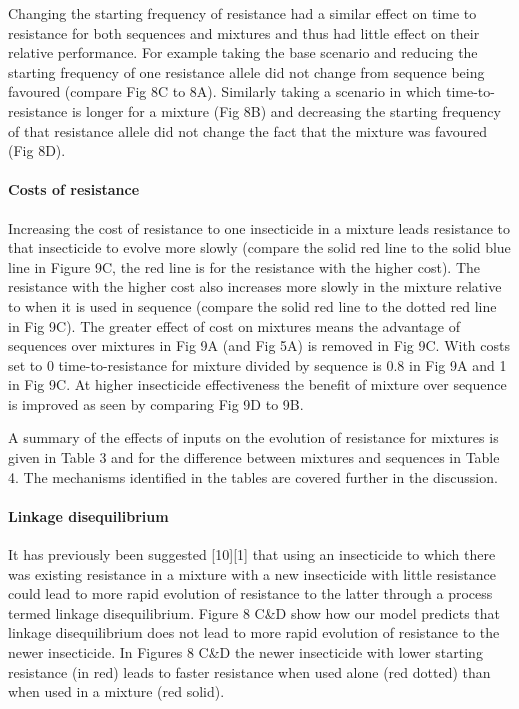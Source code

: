 \documentclass[11pt,]{article}
\let\oldparagraph\paragraph
\renewcommand{\paragraph}[1]{\oldparagraph{#1}\mbox{}}
\begin{document}
Changing the starting frequency of resistance had a similar effect on
time to resistance for both sequences and mixtures and thus had little
effect on their relative performance. For example taking the base
scenario and reducing the starting frequency of one resistance allele
did not change from sequence being favoured (compare Fig 8C to 8A).
Similarly taking a scenario in which time-to-resistance is longer for a
mixture (Fig 8B) and decreasing the starting frequency of that
resistance allele did not change the fact that the mixture was favoured
(Fig 8D).

\paragraph{Costs of resistance}\label{costs-of-resistance}

Increasing the cost of resistance to one insecticide in a mixture leads
resistance to that insecticide to evolve more slowly (compare the solid
red line to the solid blue line in Figure 9C, the red line is for the
resistance with the higher cost). The resistance with the higher cost
also increases more slowly in the mixture relative to when it is used in
sequence (compare the solid red line to the dotted red line in Fig 9C).
The greater effect of cost on mixtures means the advantage of sequences
over mixtures in Fig 9A (and Fig 5A) is removed in Fig 9C. With costs
set to 0 time-to-resistance for mixture divided by sequence is 0.8 in
Fig 9A and 1 in Fig 9C. At higher insecticide effectiveness the benefit
of mixture over sequence is improved as seen by comparing Fig 9D to 9B.

A summary of the effects of inputs on the evolution of resistance for
mixtures is given in Table 3 and for the difference between mixtures and
sequences in Table 4. The mechanisms identified in the tables are
covered further in the discussion.

\paragraph{Linkage disequilibrium}\label{linkage-disequilibrium}

It has previously been suggested {[}10{]}{[}1{]} that using an
insecticide to which there was existing resistance in a mixture with a
new insecticide with little resistance could lead to more rapid
evolution of resistance to the latter through a process termed linkage
disequilibrium. Figure 8 C\&D show how our model predicts that linkage
disequilibrium does not lead to more rapid evolution of resistance to
the newer insecticide. In Figures 8 C\&D the newer insecticide with
lower starting resistance (in red) leads to faster resistance when used
alone (red dotted) than when used in a mixture (red solid).
\end{document}
